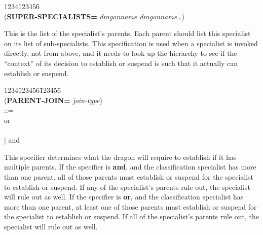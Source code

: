 \begin{tabbing}
1234\=123456\= \kill
\\
({\bf SUPER-SPECIALISTS=} {\it dragonname dragonname\/}\ldots) \\
\end{tabbing}
This is the list of the specialist's parents. Each parent should list
this specialist on its list of sub-specialists. This specification is
used when a specialist is invoked directly, not from above, and it
needs to look up the hierarchy to see if the ``context'' of its
decision to establish or suspend is such that it actually can
establish or suspend.

\begin{tabbing}
1234\=123456\=123456\= \kill
\\
({\bf PARENT-JOIN=} {\it join-type}) \\
\> ::= \\
\>\>\>or \\
\\
\>\>\>| and
\end{tabbing}
This specifier determines what the dragon will require to establish if
it has multiple parents. If the specifier is {\bf and}, and the
classification specialist has more than one parent, all of those
parents must establish or suspend for the specialist to establish or
suspend. If any of the specialist's parents rule out, the specialist
will rule out as well. If the specifier is {\bf or}, and the
classification specialist has more than one parent, at least one of
those parents must establish or suspend for the specialist to
establish or suspend. If all of the specialist's parents rule out, the
specialist will rule out as well.


